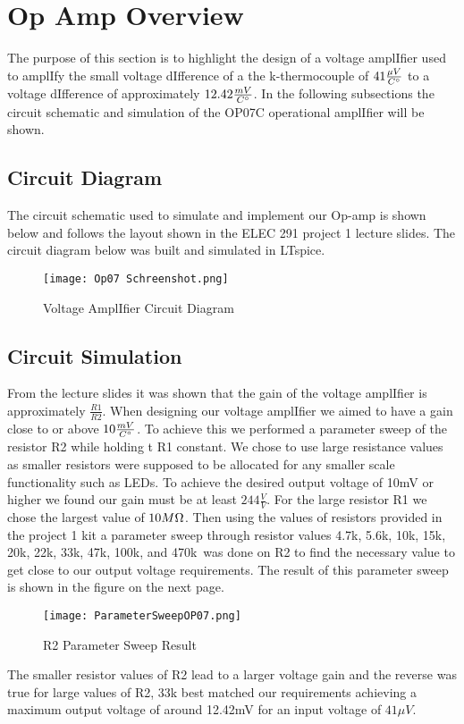 \documentclass{article}
\begin{document}
\section{Op Amp Overview}

The purpose of this section is to highlight the design of a voltage
amplIfier used to amplIfy the small voltage dIfference of a the k-thermocouple of $41\frac{{\mu}V}{C\degree}$ to a voltage dIfference of approximately $12.42\frac{mV}{C\degree}$. In the following subsections the circuit schematic and simulation of the OP07C operational amplIfier will be shown.

\subsection{Circuit Diagram}

The circuit schematic used to simulate and implement our Op-amp is shown below and follows the layout shown in the ELEC 291 project 1 lecture slides. The circuit diagram below was built and simulated in LTspice.
    \begin{figure}[h]
        \centering
        \texttt{[image: Op07 Schreenshot.png]}
        \caption{Voltage AmplIfier Circuit Diagram}
        \label{fig:Op-Amp}
    \end{figure}
\subsection{Circuit Simulation}
From the lecture slides it was shown that the gain of the voltage amplIfier is approximately $\frac{R1}{R2}$. When designing our voltage amplIfier we aimed to have a gain close to or above $10\frac{mV}{C\degree}$. To achieve this we performed a parameter sweep of the resistor R2 while holding t R1 constant. We chose to use large resistance values as smaller resistors were supposed to be allocated for any smaller scale functionality such as LEDs. To achieve the desired output voltage of 10mV or higher we found our gain must be at least $244\frac{V}{V}$. For the large resistor R1 we chose the largest value of $10M\ohm$. Then using the values of resistors provided in the project 1 kit a parameter sweep through resistor values 4.7k\ohm, 5.6k\ohm, 10k\ohm, 15k\ohm, 20k\ohm, 22k\ohm, 33k\ohm, 47k\ohm, 100k\ohm, and 470k\ohm\ was done on R2 to find the necessary value to get close to our output voltage requirements. The result of this parameter sweep is shown in the figure on the next page.
\newpage
 \begin{figure}[h]
        \centering
        \texttt{[image: ParameterSweepOP07.png]}
        \caption{R2 Parameter Sweep Result}
        \label{fig:Param Sweep}
 \end{figure}

The smaller resistor values of R2 lead to a larger voltage gain and the reverse was true for large values of R2, 33k{\ohm} best matched our requirements achieving a maximum output voltage of around 12.42mV for an input voltage of $41{\mu}V$.
\end{document}
